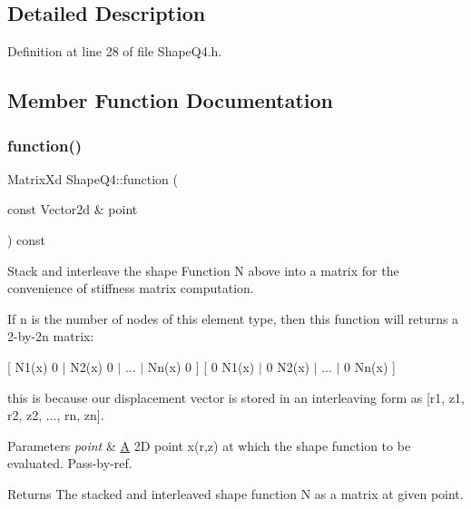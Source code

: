 \subsection{Detailed Description}


Definition at line 28 of file Shape\+Q4.\+h.



\subsection{Member Function Documentation}
\mbox{\label{class_shape_q4_a306cacfd4d87384b3d06c2788cafd4ba}} 
\subsubsection{\texorpdfstring{function()}{function()}}
{\footnotesize\ttfamily Matrix\+Xd Shape\+Q4\+::function (\begin{DoxyParamCaption}\item[{const Vector2d \&}]{point }\end{DoxyParamCaption}) const\hspace{0.3cm}{\ttfamily [virtual]}}



Stack and interleave the shape Function N above into a matrix for the convenience of stiffness matrix computation. 

If n is the number of nodes of this element type, then this function will returns a 2-\/by-\/2n matrix\+:

\mbox{[} N1(x) 0 $\vert$ N2(x) 0 $\vert$ ... $\vert$ Nn(x) 0 \mbox{]} \mbox{[} 0 N1(x) $\vert$ 0 N2(x) $\vert$ ... $\vert$ 0 Nn(x) \mbox{]}

this is because our displacement vector is stored in an interleaving form as \mbox{[}r1, z1, r2, z2, ..., rn, zn\mbox{]}.


\begin{DoxyParams}{Parameters}
{\em point} & \mbox{\hyperlink{class_a}{A}} 2D point x(r,z) at which the shape function to be evaluated. Pass-\/by-\/ref. \\
\hline
\end{DoxyParams}
\begin{DoxyReturn}{Returns}
The stacked and interleaved shape function N as a matrix at given point. 
\end{DoxyReturn}


